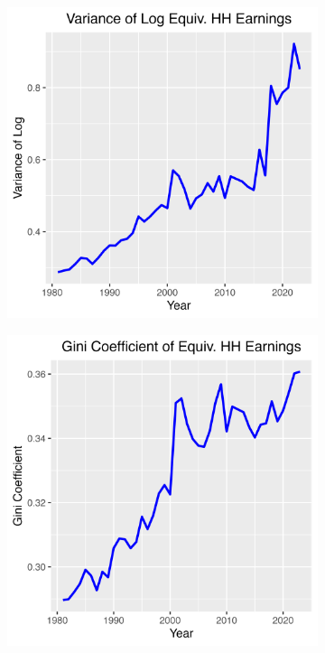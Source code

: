 \documentclass{article}
\begin{document}
\begin{figure}
    \centering
    \begin{subfigure}[t]{0.475\textwidth}
        \centering
        \includegraphics[width=\textwidth]{Fig_1/Fig_1a_Var_Earnings.png}
        \label{fig:earnings_inequality_Var}
    \end{subfigure}
    \begin{subfigure}[t]{0.475\textwidth}
        \centering
        \includegraphics[width=\textwidth]{Fig_1/Fig_1b_Gini_Earnings.png}

\end{subfigure}
\end{figure}
\end{document}
